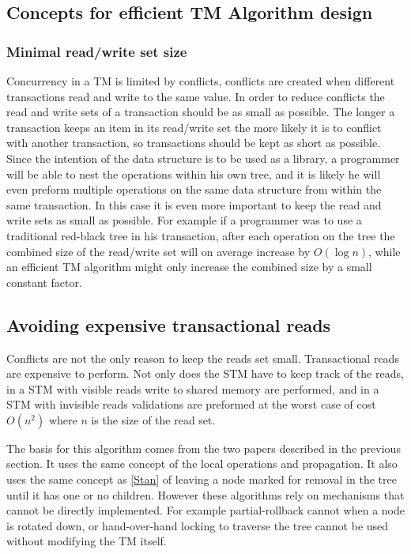 \documentclass[10pt]{sigplanconf}
\begin{document}
\subsection{Concepts for efficient TM Algorithm design}
\subsubsection{Minimal read/write set size}
Concurrency in a TM is limited by conflicts, conflicts are created when different transactions read and write to the same value.
In order to reduce conflicts the read and write sets of a transaction should be as small as possible.
The longer a transaction keeps an item in its read/write set the more likely it is to conflict with another transaction, so transactions should be kept as short as possible.
Since the intention of the data structure is to be used as a library, a programmer will be able to nest the operations within his own tree, and it is likely he will even preform multiple operations on the same data structure from within the same transaction.
In this case it is even more important to keep the read and write sets as small as possible.
For example if a programmer was to use a traditional red-black tree in his transaction, after each operation on the tree the combined size of the read/write set will on average increase by $O(\log{n})$, while an efficient TM algorithm might only increase the combined size by a small constant factor.

\subsection{Avoiding expensive transactional reads}
Conflicts are not the only reason to keep the reads set small.
Transactional reads are expensive to perform.
Not only does the STM have to keep track of the reads, in a STM with visible reads write to shared memory are performed, and in a STM with invisible reads validations are preformed at the worst case of cost $O(n^2)$ where $n$ is the size of the read set.

The basis for this algorithm comes from the two papers described in the previous section.
It uses the same concept of the local operations and propagation.
It also uses the same concept as \ref{Stan} of leaving a node marked for removal in the tree until it has one or no children.
However these algorithms rely on mechanisms that cannot be directly implemented.
For example partial-rollback cannot when a node is rotated down, or hand-over-hand locking to traverse the tree cannot be used without modifying the TM itself.
\end{document}
